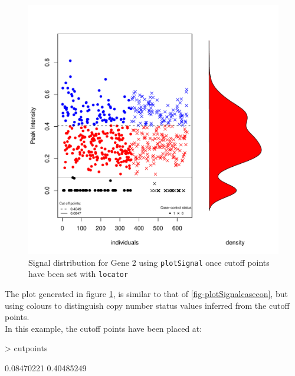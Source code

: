 \documentclass[11pt]{article}
\begin{document}

\begin{figure}[ht]
\begin{center}
\includegraphics{./figures/fig1.pdf}
\caption{\small Signal distribution for Gene 2 using \texttt{plotSignal} once cutoff points have been set with \texttt{locator}}
\label{fig-plotSignalcutoffs}
\end{center}
\end{figure}


The plot generated in figure \ref{fig-plotSignalcutoffs}, is similar to that of \ref{fig-plotSignalcasecon}, but using colours to distinguish copy number status values inferred 
from the cutoff points.\\

In this example, the cutoff points have been placed at:

\begin{Schunk}
\begin{Sinput}
> cutpoints
\end{Sinput}
\begin{Soutput}
[1] 0.08470221 0.40485249
\end{Soutput}
\end{Schunk}
\end{document}
